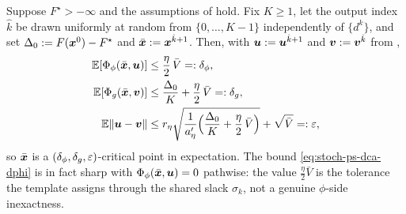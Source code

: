 \begin{corollary}
\label{cor:stoch-ps-dca-rate}
Suppose $F^\star>-\infty$ and the assumptions of
 hold. Fix $K\ge1$, let the output
index $\hat k$ be drawn uniformly at random from $\{0,\dots,K-1\}$
independently of $\{d^k\}$, and set $\Delta_0:=F(\bm{x}^0)-F^\star$ and
$\bar{\bm{x}}:=\bm{x}^{\hat k+1}$. Then, with $\bm{u}:=\bm{u}^{\hat k+1}$ and
$\bm{v}:=\bm{v}^{\hat k}$ from ,
\begin{align}
    \mathbb{E}[\Phi_\phi(\bar{\bm{x}},\bm{u})]
    &\le
    \frac\eta2\,\bar V
    =:\delta_\phi,
    \label{eq:stoch-ps-dca-dphi}
    \\
    \mathbb{E}[\Phi_g(\bar{\bm{x}},\bm{v})]
    &\le
    \frac{\Delta_0}K+\frac\eta2\,\bar V
    =:\delta_g,
    \label{eq:stoch-ps-dca-dg}
    \\
    \mathbb{E}\lVert \bm{u}-\bm{v}\rVert
    &\le
    r_\eta
    \sqrt{
        \frac1{a'_\eta}
        \Bigl(\frac{\Delta_0}K+\frac\eta2\,\bar V\Bigr)
    }
    +\sqrt{\bar V}
    =:\varepsilon ,
    \label{eq:stoch-ps-dca-eps}
\end{align}
so $\bar{\bm{x}}$ is a $(\delta_\phi,\delta_g,\varepsilon)$-critical point in
expectation. The bound \eqref{eq:stoch-ps-dca-dphi} is in fact sharp
with $\Phi_\phi(\bar{\bm{x}},\bm{u})=0$ pathwise: the value $\tfrac\eta2\bar V$
is the tolerance the template assigns through the shared slack
$\sigma_k$, not a genuine $\phi$-side inexactness.
\end{corollary}

